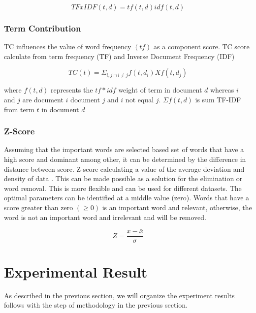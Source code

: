 \documentclass[conference]{IEEEtran}
\begin{document}
\begin{equation}
	\label{eq:tf-idf}
    TFxIDF(t,d) = tf(t,d) idf(t,d)
\end{equation}



\subsubsection{Term Contribution}
TC influences the value of word frequency \((tf)\) as a component score. TC score calculate from term frequency (TF) and Inverse Document Frequency (IDF) \cite{Liu}

\begin{equation}
	\label{eq:TC_score}
    TC(t) = \Sigma_{i,j \cap i \neq j} f(t,d_{i}) X f(t,d_{j})
\end{equation}

where \(f(t,d)\) represents the \(tf*idf\) weight of term in document \(d\) whereas \(i\) and \(j\) are document \(i\) document \(j\) and \(i\) not equal \(j\). \(\Sigma f(t,d)\) is sum TF-IDF from term \(t\) in document \(d\)

\subsubsection{Z-Score}
Assuming that the important words are selected based set of words that have a high score and dominant among other, it can be determined by the difference in distance between score. Z-score calculating a value of the average deviation and density of data \cite{Olga}. This can be made possible as a solution for the elimination or  word removal. This is more flexible and can be used for different datasets. The optimal parameters can be identified at a middle value (zero). Words that have a score greater than zero \((\geq 0)\) is an important word and relevant, otherwise,  the word is not an important word and irrelevant and will be removed.

\begin{equation}
	\label{eq:Z_score}
    Z = \frac{x - \bar{x}}{\sigma}
\end{equation}

\section{Experimental Result}
As described in the previous section, we will organize the experiment results follows with the step of methodology in the previous section.
\end{document}
